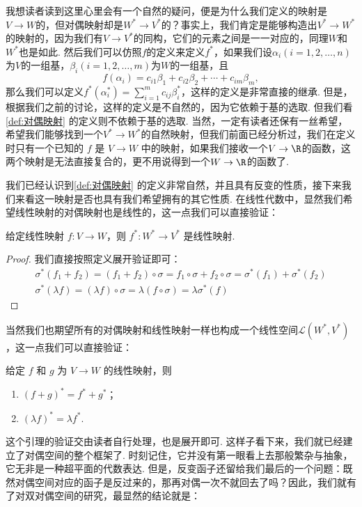 我想读者读到这里心里会有一个自然的疑问，便是为什么我们定义的映射是$V\to W$的，但对偶映射却是$W^*\to V^*$的？事实上，我们肯定是能够构造出$V^*\to W^*$的映射的，因为我们有$V\to V^*$的同构，它们的元素之间是一一对应的，同理$W$和$W^*$也是如此. 然后我们可以仿照$f$的定义来定义$f^*$，如果我们设$\alpha_i(i=1,2,\ldots,n)$为$V$的一组基，$\beta_i(i=1,2,\ldots,m)$为$W$的一组基，且
\[f(\alpha_i)=c_{i1}\beta_1+c_{i2}\beta_2+\cdots+c_{im}\beta_m,\]
那么我们可以定义$f^*(\alpha_i^*)=\sum\limits_{i=1}^m c_{ij}\beta_i^*$，这样的定义是非常直接的继承. 但是，根据我们之前的讨论，这样的定义是不自然的，因为它依赖于基的选取. 但我们看\autoref{def:对偶映射} 的定义则不依赖于基的选取. 当然，一定有读者还保有一丝希望，希望我们能够找到一个$V^*\to W^*$的自然映射，但我们前面已经分析过，我们在定义时只有一个已知的 $f$ 是 $V\to W$ 中的映射，如果我们接收一个$V\to \R$的函数，这两个映射是无法直接复合的，更不用说得到一个$W\to \R$的函数了.

我们已经认识到\autoref{def:对偶映射} 的定义非常自然，并且具有反变的性质，接下来我们来看这一映射是否也具有我们希望拥有的其它性质. 在线性代数中，显然我们希望线性映射的对偶映射也是线性的，这一点我们可以直接验证：
\begin{lemma}{}{}
    给定线性映射 $f\colon V \to W$，则 $f^*: W^* \to V^*$ 是线性映射.
\end{lemma}
\begin{proof}
    我们直接按照定义展开验证即可：
    \begin{gather*}
        \sigma^*(f_1+f_2)=(f_1+f_2)\circ\sigma=f_1\circ\sigma+f_2\circ\sigma=\sigma^*(f_1)+\sigma^*(f_2) \\
        \sigma^*(\lambda f)=(\lambda f)\circ\sigma=\lambda(f\circ\sigma)=\lambda\sigma^*(f)
    \end{gather*}
\end{proof}

当然我们也期望所有的对偶映射和线性映射一样也构成一个线性空间$\mathcal{L}(W^*,V^*)$，这一点我们可以直接验证：
\begin{lemma}{}{}
    给定 $f$ 和 $g$ 为 $V \to W$ 的线性映射，则
    \begin{enumerate}
        \item $(f + g)^* = f^* + g^*$；
        \item $(\lambda f)^* = \lambda f^*$.
    \end{enumerate}
\end{lemma}

这个引理的验证交由读者自行处理，也是展开即可. 这样子看下来，我们就已经建立了对偶空间的整个框架了. 时刻记住，它并没有第一眼看上去那般繁杂与抽象，它无非是一种超平面的代数表达. 但是，反变函子还留给我们最后的一个问题：既然对偶空间对应的函子是反过来的，那再对偶一次不就回去了吗？因此，我们就有了对双对偶空间的研究，最显然的结论就是：

